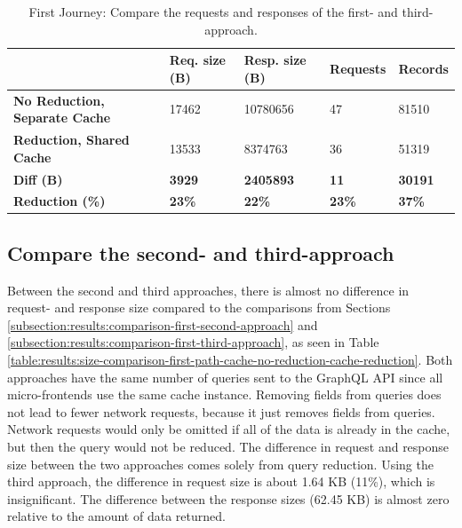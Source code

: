 \ifshowTables
\begin{table}[H]
  \begin{tabular}{|l|l|l|l|l|}
  \hline
  & \textbf{Req. size (B)} & \textbf{Resp. size (B)} & \textbf{Requests} & \textbf{Records}  \\
  \hline
  \textbf{No Reduction, Separate Cache} & 17462 & 10780656 & 47 & 81510 \\
  \hline
  \textbf{Reduction, Shared Cache} & 13533 & 8374763 & 36 & 51319 \\
  \hline
  \hline
  \textbf{Diff (B)} & \textbf{3929} & \textbf{2405893} & \textbf{11} & \textbf{30191} \\
  \hline
  \textbf{Reduction (\%)} & \textbf{23\%} & \textbf{22\%} & \textbf{23\%} & \textbf{37\%} \\
  \hline
  \end{tabular}
  \caption{First Journey: Compare the requests and responses of the first- and third-approach.}\label{table:results:size-comparison-first-path-no-cache-no-reduction-cache-reduction}
\end{table}
\fi

\subsection{Compare the second- and third-approach}\label{subsection:results:comparison-second-third-approach}

Between the second and third approaches, there is almost no difference in request- and response size compared to the comparisons from Sections \ref{subsection:results:comparison-first-second-approach} and \ref{subsection:results:comparison-first-third-approach}, as seen in Table \ref{table:results:size-comparison-first-path-cache-no-reduction-cache-reduction}. Both approaches have the same number of queries sent to the GraphQL \ac{API} since all micro-frontends use the same cache instance. Removing fields from queries does not lead to fewer network requests, because it just removes fields from queries. Network requests would only be omitted if all of the data is already in the cache, but then the query would not be reduced. The difference in request and response size between the two approaches comes solely from query reduction. Using the third approach, the difference in request size is about 1.64 KB (11\%), which is insignificant. The difference between the response sizes (62.45 KB) is almost zero relative to the amount of data returned.

